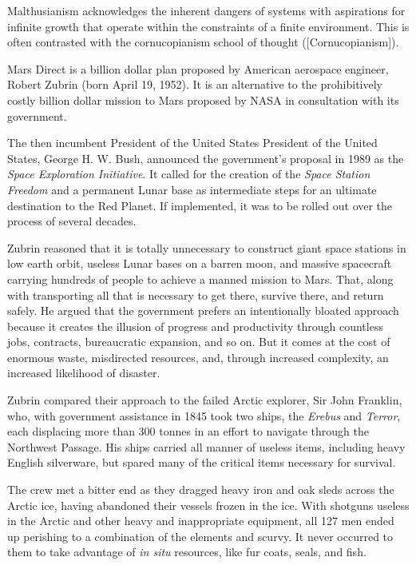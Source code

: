 Malthusianism acknowledges the inherent dangers of systems with aspirations for infinite growth that operate within the constraints of a finite environment. This is often contrasted with the cornucopianism school of thought ([Cornucopianism]).

Mars Direct is a  billion dollar plan proposed by American aerospace engineer, Robert Zubrin (born April 19, 1952). It is an alternative to the prohibitively costly  billion dollar mission to Mars proposed by NASA in consultation with its government.

The then incumbent President of the United States President of the United States, George H. W. Bush, announced the government's proposal in 1989 as the {\it Space Exploration Initiative}. It called for the creation of the {\it Space Station Freedom} and a permanent Lunar base as intermediate steps for an ultimate destination to the Red Planet. If implemented, it was to be rolled out over the process of several decades.

Zubrin reasoned that it is totally unnecessary to construct giant space stations in low earth orbit, useless Lunar bases on a barren moon, and massive spacecraft carrying hundreds of people to achieve a manned mission to Mars. That, along with transporting all that is necessary to get there, survive there, and return safely. He argued that the government prefers an intentionally bloated approach because it creates the illusion of progress and productivity through countless jobs, contracts, bureaucratic expansion, and so on. But it comes at the cost of enormous waste, misdirected resources, and, through increased complexity, an increased likelihood of disaster.

Zubrin compared their approach to the failed Arctic explorer, Sir John Franklin, who, with government assistance in 1845 took two ships, the {\it Erebus} and {\it Terror}, each displacing more than 300 tonnes in an effort to navigate through the Northwest Passage. His ships carried all manner of useless items, including heavy English silverware, but spared many of the critical items necessary for survival. 

The crew met a bitter end as they dragged heavy iron and oak sleds across the Arctic ice, having abandoned their vessels frozen in the ice. With shotguns useless in the Arctic and other heavy and inappropriate equipment, all 127 men ended up perishing to a combination of the elements and scurvy. It never occurred to them to take advantage of {\it in situ} resources, like fur coats, seals, and fish.

